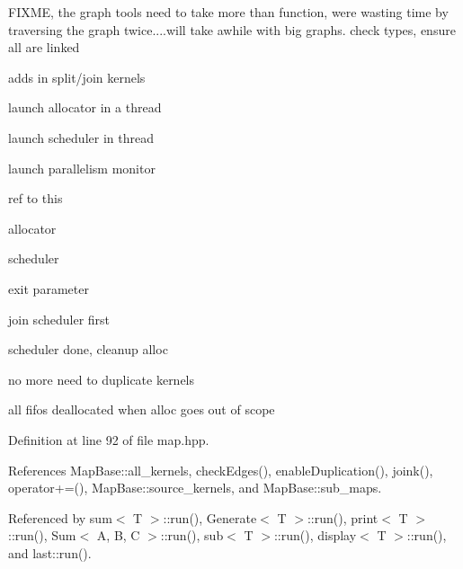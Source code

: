 F\+I\+X\+ME, the graph tools need to take more than function, we\textquotesingle{}re wasting time by traversing the graph twice....will take awhile with big graphs. check types, ensure all are linked

adds in split/join kernels

launch allocator in a thread

launch scheduler in thread

launch parallelism monitor

ref to this

allocator

scheduler

exit parameter

join scheduler first

scheduler done, cleanup alloc

no more need to duplicate kernels

all fifo\textquotesingle{}s deallocated when alloc goes out of scope 

Definition at line 92 of file map.\+hpp.



References Map\+Base\+::all\+\_\+kernels, check\+Edges(), enable\+Duplication(), joink(), operator+=(), Map\+Base\+::source\+\_\+kernels, and Map\+Base\+::sub\+\_\+maps.



Referenced by sum$<$ T $>$\+::run(), Generate$<$ T $>$\+::run(), print$<$ T $>$\+::run(), Sum$<$ A, B, C $>$\+::run(), sub$<$ T $>$\+::run(), display$<$ T $>$\+::run(), and last\+::run().


